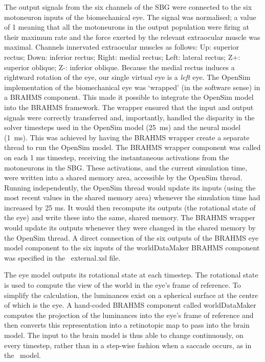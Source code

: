 \documentclass{frontiersSCNS}
\begin{document}
The output signals from the six channels of the SBG were connected to
the six motoneuron inputs of the biomechanical eye. The signal was
normalised; a value of 1 meaning that all the motoneurons in the
output population were firing at their maximum rate and the force
exerted by the relevant extraocular muscle was maximal. Channels
innervated extraocular muscles as follows: Up: superior rectus; Down:
inferior rectus; Right: medial rectus; Left: lateral rectus; Z+:
superior oblique; Z-: inferior oblique. Because the medial rectus
induces a rightward rotation of the eye, our single virtual eye is
a \emph{left} eye. The OpenSim implementation of the biomechanical eye
was `wrapped' (in the software sense) in a BRAHMS component. This made
it possible to integrate the OpenSim model into the BRAHMS
framework. The wrapper ensured that the input and output signals were
correctly transferred and, importantly, handled the disparity in the
solver timesteps used in the OpenSim model (25~ms) and the neural
model (1~ms). This was achieved by having the BRAHMS wrapper create a
separate thread to run the OpenSim model. The BRAHMS wrapper component
was called on each 1 ms timestep, receiving the instantaneous
activations from the motoneurons in the SBG. These activations, and
the current simulation time, were written into a shared memory area,
accessible by the OpenSim thread. Running independently, the OpenSim
thread would update its inputs (using the most recent values in the
shared memory area) whenever the simulation time had increased by 25
ms. It would then recompute its outputs (the rotational state of the
eye) and write these into the same, shared memory. The BRAHMS wrapper
would update its outputs whenever they were changed in the shared
memory by the OpenSim thread. A direct connection of the six outputs
of the BRAHMS eye model component to the six inputs of the
worldDataMaker BRAHMS component was specified in
the \stob~external.xsl file.

The eye model outputs its rotational state at each
timestep. The rotational state is used to compute the view of the
world in the eye's frame of reference. To simplify
the calculation, the luminances exist on a spherical surface at the
centre of which is the eye. A hand-coded BRAHMS component called
worldDataMaker computes the projection of the luminances into the
eye's frame of reference and then converts this representation into a
retinotopic map to pass into the brain model. The input to the brain
model is thus able to change continuously, on every timestep, rather
than in a step-wise fashion when a saccade occurs, as in the \ccg~model.
\end{document}
